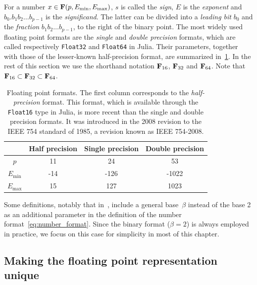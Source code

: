 For a number $x \in \mathbf F(p, E_{\min}, E_{\max})$,
$s$ is called the \emph{sign}, $E$ is the \emph{exponent} and
$b_0. b_1 b_2 \dots b_{p-1}$ is the \emph{significand}.
The latter can be divided into a \emph{leading bit} $b_0$ and the \emph{fraction} $b_1 b_2 \dots b_{p-1}$,
to the right of the binary point.
The most widely used floating point formats are the \emph{single} and \emph{double precision} formats,
which are called respectively \texttt{Float32} and \texttt{Float64} in Julia.
Their parameters,
together with those of the lesser-known half-precision format,
are summarized in~\cref{table:floating_point_formats}.
In the rest of this section we use the shorthand notation $\mathbf F_{16}$, $\mathbf F_{32}$ and $\mathbf F_{64}$.
Note that $\mathbf F_{16} \subset \mathbf F_{32} \subset \mathbf F_{64}$.
\begin{table}[ht]
    \centering
    \begin{tabular}{|c|c|c|c|}
        \hline
        & Half precision & Single precision & Double precision
        \\ \hline
        $p$ & 11 & 24 & 53
        \\ \hline
        $E_{\min}$ & -14 & -126 & -1022
        \\ \hline
        $E_{\max}$ & 15 & 127 & 1023
        \\ \hline
    \end{tabular}
    \caption{%
        Floating point formats.
        The first column corresponds to the \emph{half-precision} format.
        This format,
        which is available through the \texttt{Float16} type in Julia,
        is more recent than the single and double precision formats.
        It was introduced in the 2008 revision to the IEEE 754 standard of 1985,
        a revision known as IEEE 754-2008.
    }%
    \label{table:floating_point_formats}
\end{table}

\begin{remark}
    Some definitions,
    notably that in~\cite[Section 2.5.2]{MR2265914},
    include a general base~$\beta$ instead of the base 2
    as an additional parameter in the definition of the number format~\eqref{eq:number_format}.
    Since the binary format ($\beta = 2$) is always employed in practice,
    we focus on this case for simplicity in most of this chapter.
\end{remark}

\subsection{Making the floating point representation unique}%
\label{sub:defining_a_unique_representation}

